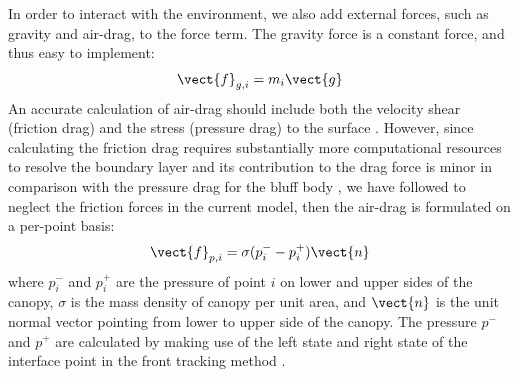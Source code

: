 In order to interact with the environment, we also add external forces, such as gravity 
and air-drag, to the force term. The gravity force is a constant force, and thus easy to implement:
\begin{equation}
\vect{f}_{g,i} = m_i \vect{g}
\end{equation}
An accurate calculation of air-drag should include both the velocity shear (friction drag) and the stress (pressure drag) to the surface \cite{anderson1985fundamentals}. However, since calculating the friction drag requires substantially more computational resources to resolve the boundary layer and its contribution to the drag force is minor in comparison with the pressure drag for the bluff body \cite{anderson1985fundamentals}, we have followed \cite{KalroTezduyar2000} to neglect the friction forces in the  current model, then the air-drag is formulated on a per-point basis:
\begin{equation}
\vect{f}_{p,i} = \sigma(p_i^- - p_i^+)\vect{n} \label{eq:drag}
\end{equation}
where $p_i^-$ and $p_i^+$ are the pressure of point $i$ on lower and upper sides of the canopy, $\sigma$ is the mass density of canopy per unit area, and $\vect{n}$ is the unit normal vector pointing from lower to upper side of the canopy. The pressure $p^-$ and $p^+$ are calculated by making use of the left state and right state of the interface point in the front tracking method \cite{glimm1998three}.


